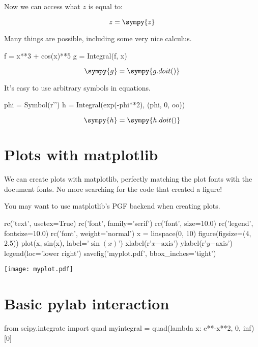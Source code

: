 \documentclass[11pt]{article}
\begin{document}
Now we can access what $z$ is equal to:

\[z=\sympy{z}\]

Many things are possible, including some very nice calculus.

\begin{sympyblock}
f = x**3 + cos(x)**5
g = Integral(f, x)
\end{sympyblock}

\[\sympy{g}=\sympy{g.doit()}\]

It's easy to use arbitrary symbols in equations.

\begin{sympyblock}
phi = Symbol(r'\phi')
h = Integral(exp(-phi**2), (phi, 0, oo))
\end{sympyblock}

\[\sympy{h}=\sympy{h.doit()}\]



\section{Plots with matplotlib}

We can create plots with matplotlib, perfectly matching the plot fonts with the document fonts.  No more searching for the code that created a figure!

You may want to use matplotlib's PGF backend when creating plots.

\begin{pylabblock}
rc('text', usetex=True)
rc('font', family='serif')
rc('font', size=10.0)
rc('legend', fontsize=10.0)
rc('font', weight='normal')
x = linspace(0, 10)
figure(figsize=(4, 2.5))
plot(x, sin(x), label='$\sin(x)$')
xlabel(r'$x\mathrm{-axis}$')
ylabel(r'$y\mathrm{-axis}$')
legend(loc='lower right')
savefig('myplot.pdf', bbox_inches='tight')
\end{pylabblock}

\begin{center}
\texttt{[image: myplot.pdf]}
\end{center}


\section{Basic pylab interaction}

\begin{pylabblock}
from scipy.integrate import quad
myintegral = quad(lambda x: e**-x**2, 0, inf)[0]
\end{pylabblock}
\end{document}
